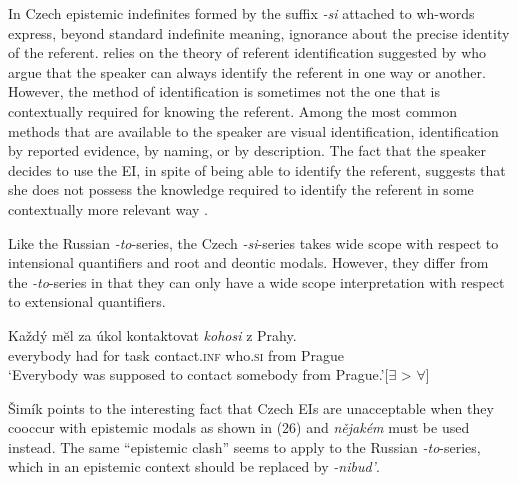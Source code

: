\documentclass[output=paper,colorlinks,citecolor=brown]{langscibook}
\begin{document}

In Czech epistemic indefinites formed by the suffix \textit{-si} attached to wh-words express, beyond standard indefinite meaning, ignorance about the precise identity of the referent. \citet{Simik2015} relies on the theory of referent identification suggested by \citet{Aloni.Port2013} who argue that the speaker can always identify the referent in one way or another. However, the method of identification is sometimes not the one that is contextually required for knowing the referent. Among the most common methods that are available to the speaker are visual identification, identification by reported evidence, by naming, or by description. The fact that the speaker decides to use the EI, in spite of being able to identify the referent, suggests that she does not possess the knowledge required to identify the referent in some contextually more relevant way \citep{Simik2015}.

Like the Russian \textit{-to}-series, the Czech \textit{-si}-series takes wide scope with respect to intensional quantifiers and root and deontic modals. However, they differ from the \textit{-to}-series in that they can only have a wide scope interpretation with respect to extensional quantifiers. 

\ea\label{geist:ex:simik1}
\gll Každý mĕl za úkol kontaktovat \textit{kohosi} z Prahy.\\
everybody had for task contact.\textsc{inf} who.\textsc{si} from Prague\\
\glt ‘Everybody was supposed to contact somebody from Prague.’\hfill [$\exists$ > $\forall$]\smallskip\\\hfill\citep[429]{Simik2015}
\z

\noindent Šimík points to the interesting fact that Czech EIs are unacceptable when they cooccur with epistemic modals as shown in (26) and \textit{nějakém} must be used instead. The same “epistemic clash” seems to apply to the Russian \textit{-to}-series, which in an epistemic context should be replaced by \textit{-nibud’}.

\z
\end{document}
